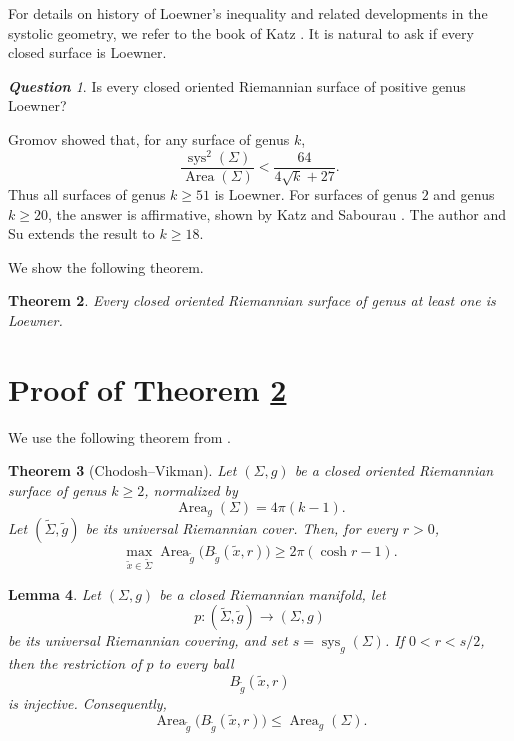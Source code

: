 \documentclass[11pt]{amsart}
\newtheorem{theorem}{Theorem}
\newtheorem{lemma}[theorem]{Lemma}
\theoremstyle{remark}
\newtheorem{question}[theorem]{\rm\bf Question}
\DeclareMathOperator{\Area}{Area}
\DeclareMathOperator{\sys}{sys}
\begin{document}
For details on history of Loewner's inequality and related developments in  the systolic geometry,
we refer to the book of Katz \cite{katz2007}. It is natural to ask if every closed surface is Loewner. 

\begin{question}
Is every closed oriented Riemannian surface of positive genus
Loewner?
\end{question}

Gromov \cite{gromov1983} showed that, for any surface of genus $k$, 
\begin{equation*}\label{equ:Loewner}
    \frac{\sys^2(\Sigma)}{\Area(\Sigma)}< \frac{64}{4\sqrt{k}+27}.
\end{equation*}
Thus all surfaces of genus $k\geq 51$ is Loewner.  For surfaces of genus $2$ and genus $k\geq 20$, the answer is affirmative, shown by Katz and Sabourau \cite{ks2005,ks2006}. The author and Su \cite{LS} extends the result to $k\geq 18$.

We show the following theorem. 

\begin{theorem}\label{cor:all}
Every closed oriented Riemannian surface of genus at least one is Loewner.
\end{theorem}

\section{Proof of Theorem \ref{cor:all}}

We use the following theorem from \cite[Theorem 4]{CV}.

\begin{theorem}[Chodosh--Vikman]\label{thm:CV}
Let $(\Sigma,g)$ be a closed oriented Riemannian surface of genus $k\geq 2$, normalized by
\[
  \Area_g(\Sigma)=4\pi(k-1).
\]
Let $(\widetilde\Sigma,\widetilde g)$ be its universal Riemannian cover. Then, for every $r>0$,
\[
  \max_{\widetilde x\in\widetilde\Sigma}
  \Area_{\widetilde g}\bigl(B_{\widetilde g}(\widetilde x,r)\bigr)
  \geq 2\pi(\cosh r-1).
\]
\end{theorem}


\begin{lemma}\label{lem:embed}
Let $(\Sigma,g)$ be a closed Riemannian manifold, let
\[
  p:(\widetilde\Sigma,\widetilde g)\longrightarrow(\Sigma,g)
\]
be its universal Riemannian covering, and set $s=\sys_g(\Sigma)$. If $0<r<s/2$, then the restriction of $p$ to every ball
\[
  B_{\widetilde g}(\widetilde x,r)
\]
is injective. Consequently,
\[
  \Area_{\widetilde g}\bigl(B_{\widetilde g}(\widetilde x,r)\bigr)
  \leq \Area_g(\Sigma).
\]
\end{lemma}
\end{document}
